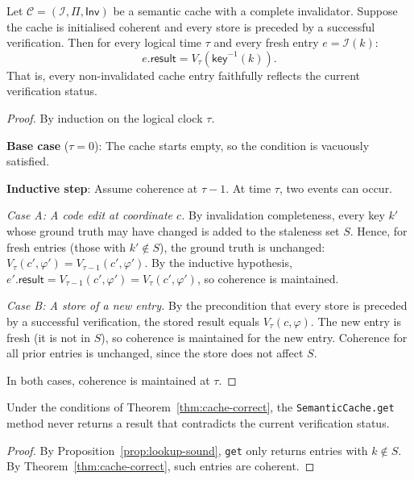 \documentclass[11pt]{article}
\newcommand{\Cache}{\mathcal{C}}                   %
\newcommand{\CacheKey}{\mathsf{key}}               %
\newcommand{\CacheIndex}{\mathcal{I}}              %
\newcommand{\CachePol}{\Pi}                        %
\newcommand{\CacheInval}{\mathsf{Inv}}             %
\begin{document}
\begin{theorem}\label{thm:cache-correct}
Let $\Cache = (\CacheIndex, \CachePol, \CacheInval)$ be a semantic
cache with a complete invalidator.  Suppose the cache is initialised
coherent and every store is preceded by a successful verification.
Then for every logical time $\tau$ and every fresh entry $e =
\CacheIndex(k)$:
\[
  e.\mathsf{result} = V_\tau(\CacheKey^{-1}(k)).
\]
That is, every non-invalidated cache entry faithfully reflects
the current verification status.
\end{theorem}
\begin{proof}
By induction on the logical clock $\tau$.

\textbf{Base case} ($\tau = 0$): The cache starts empty, so the
condition is vacuously satisfied.

\textbf{Inductive step}: Assume coherence at $\tau - 1$.  At time
$\tau$, two events can occur.

\emph{Case A: A code edit at coordinate $c$.}  By invalidation
completeness, every key $k'$ whose ground truth may have changed is
added to the staleness set $S$.  Hence, for fresh entries (those with
$k' \notin S$), the ground truth is unchanged: $V_\tau(c',\varphi') =
V_{\tau-1}(c', \varphi')$.  By the inductive hypothesis,
$e'.\mathsf{result} = V_{\tau-1}(c', \varphi') = V_\tau(c', \varphi')$,
so coherence is maintained.

\emph{Case B: A store of a new entry.}  By the precondition that every
store is preceded by a successful verification, the stored result
equals $V_\tau(c, \varphi)$.  The new entry is fresh (it is not in
$S$), so coherence is maintained for the new entry.  Coherence for
all prior entries is unchanged, since the store does not affect $S$.

In both cases, coherence is maintained at $\tau$.
\end{proof}

\begin{corollary}\label{cor:no-stale}
Under the conditions of Theorem~\ref{thm:cache-correct}, the
\texttt{SemanticCache.get} method never returns a result that
contradicts the current verification status.
\end{corollary}
\begin{proof}
By Proposition~\ref{prop:lookup-sound}, \texttt{get} only returns
entries with $k \notin S$.  By Theorem~\ref{thm:cache-correct},
such entries are coherent.
\end{proof}
\end{document}
